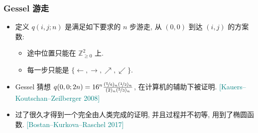 \documentclass{ctexbeamer}
\newcommand{\cnote}[2][\footnotesize]{\textcolor{teal}{#1[#2]}}
\newcommand{\bbZ}{\mathbb Z}
\begin{document}
\begin{frame}
  \frametitle{Gessel 游走}

  \begin{itemize}
    \item 定义 $q(i, j; n)$ 是满足如下要求的 $n$ 步游走, 从 $(0, 0)$ 到达 $(i, j)$ 的方案数:
    \begin{itemize}
      \item 途中位置只能在 $\bbZ_{\geq 0}^2$ 上.
      \item 每一步只能是 $\{ \leftarrow, \rightarrow, \nearrow, \swarrow \}$.
    \end{itemize}
    \item<2-> Gessel 猜想 $q(0, 0; 2n) = 16^n \frac{(\nicefrac{5}{6})_n (\nicefrac{1}{2})_n}{(2)_n (\nicefrac 5 3)_n}$,
    在计算机的辅助下被证明. \cnote{Kauers--Koutschan--Zeilberger 2008}
    \item<3-> 过了很久才得到一个完全由人类完成的证明, 并且过程并不初等, 用到了椭圆函数. \cnote{Bostan--Kurkova--Raschel 2017}
\end{itemize}
\end{frame}
\end{document}

